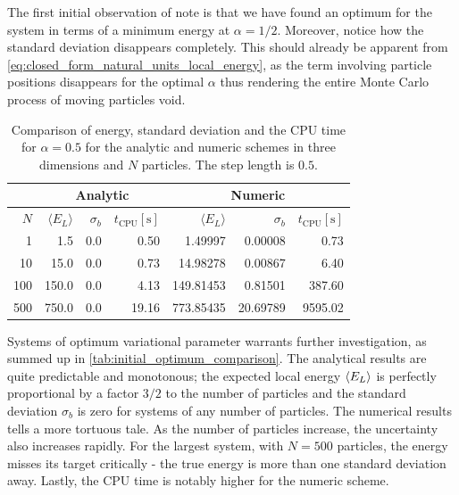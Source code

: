 \documentclass[
    a4paper, aps, twocolumn, floatfix, superscriptaddress,
    nofootinbib]{revtex4-1}
\newcommand{\1}{\mathds{1}}
\begin{document}
        The first initial observation of note is that we have found an optimum
        for the system in terms of a minimum energy at $\alpha = 1/2$.
        Moreover, notice how the standard deviation disappears completely.  This
        should already be apparent from
        \autoref{eq:closed_form_natural_units_local_energy}, as the term
        involving particle positions disappears for the optimal $\alpha$ thus
        rendering the entire Monte Carlo process of moving particles void.

        \begin{table}
            \caption{Comparison of energy, standard deviation and the CPU time
            for $\alpha = 0.5$ for the analytic and numeric schemes in three
            dimensions and $N$ particles. The step length is $0.5$.}
            \centering
            \begin{ruledtabular}
                \begin{tabular}{r|rrr|rrr}
                    & \multicolumn{3}{c|}{Analytic}
                    & \multicolumn{3}{c}{Numeric} \\
                    \hline
                    $N$
                    & $\langle E_L\rangle$ & $\sigma_b$
                    & $t_{\text{CPU}} [\si{\second}]$
                    & $\langle E_L\rangle$ & $\sigma_b$
                    & $t_{\text{CPU}} [\si{\second}]$ \\
                    \hline
                    1 & 1.5 & 0.0 & 0.50
                    & 1.49997 & 0.00008 & 0.73 \\
                    10 & 15.0 & 0.0 & 0.73
                    & 14.98278 & 0.00867 & 6.40 \\
                    100 & 150.0 & 0.0 & 4.13
                    & 149.81453 & 0.81501 & 387.60 \\
                    500 & 750.0 & 0.0 & 19.16
                    & 773.85435 & 20.69789 & 9595.02
                \end{tabular}
            \end{ruledtabular}
            \label{tab:initial_optimum_comparison}
        \end{table}


        Systems of optimum variational parameter warrants further investigation,
        as summed up in \autoref{tab:initial_optimum_comparison}. The analytical
        results are quite predictable and monotonous; the expected local energy
        $\expval{E_L}$ is perfectly proportional by a factor $3/2$ to
        the number of particles and the standard deviation $\sigma_b$ is zero
        for systems of any number of particles. The numerical results tells a
        more tortuous tale. As the number of particles increase, the uncertainty
        also increases rapidly. For the largest system, with $N = 500$
        particles, the energy misses its target critically - the true energy is
        more than one standard deviation away. Lastly, the CPU time is notably
        higher for the numeric scheme.
\end{document}
